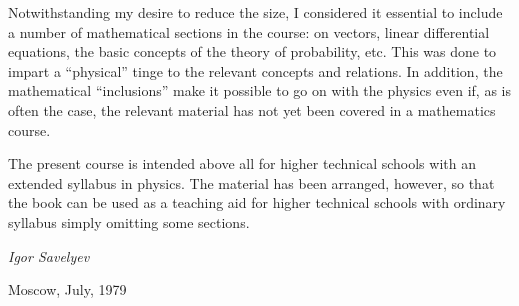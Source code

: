 Notwithstanding my desire to reduce the size, I considered it essential to include a number of mathematical sections in the course: on vectors, linear differential equations, the basic concepts of the theory of probability, etc. This was done to impart a ``physical'' tinge to the relevant concepts and relations. In addition, the mathematical ``inclusions'' make it possible to go on with the physics even if, as is often the case, the relevant material has not yet been covered in a mathematics course.

The present course is intended above all for higher technical schools with an extended syllabus in physics. The material has been arranged, however, so that the book can be used as a teaching aid for higher technical schools with ordinary syllabus simply omitting some sections.

\begin{flushright}
	\emph{Igor Savelyev}
\end{flushright}

\noindent
Moscow, July, 1979

